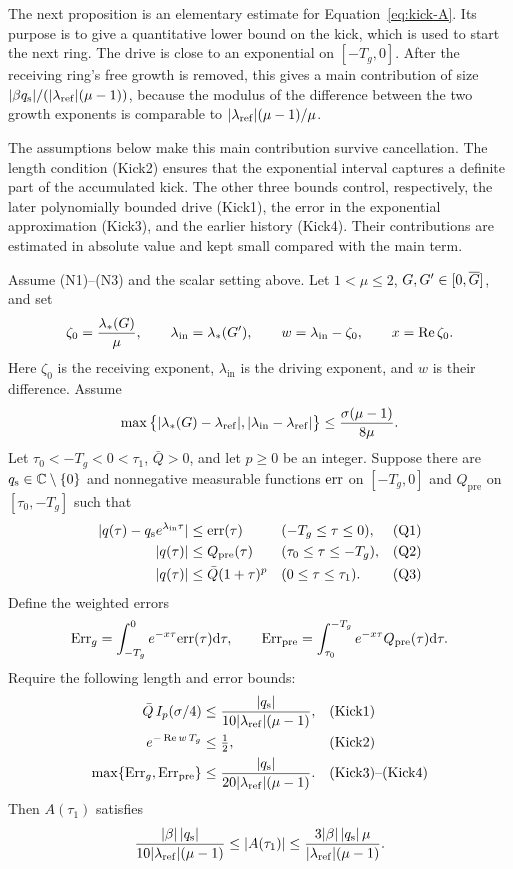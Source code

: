 The next proposition is an elementary estimate for Equation~\eqref{eq:kick-A}.
Its purpose is to give a quantitative lower bound on the kick, which is used
to start the next ring. The drive is close to an exponential on
$[-T_g,0]$. After the receiving ring's free growth is removed, this gives a
main contribution of size $|\beta q_{\mathrm{s}}|/(|\lambda_{\mathrm{ref}}|(\mu-1))$, because the
modulus of the difference between the two growth exponents is comparable to
$|\lambda_{\mathrm{ref}}|(\mu-1)/\mu$.

The assumptions below make this main contribution survive cancellation.
The length condition \textup{(Kick2)} ensures that the exponential interval
captures a definite part of the accumulated kick. The other three bounds
control, respectively, the later polynomially bounded drive
\textup{(Kick1)}, the error in the exponential approximation
\textup{(Kick3)}, and the earlier history \textup{(Kick4)}. Their contributions
are estimated in absolute value and kept small compared with the main term.

\begin{samepage}
\begin{proposition}
\label{prop:kick}
Assume \textup{(N1)}--\textup{(N3)} and the scalar setting above. Let
$1<\mu\le2$, $G,G'\in[0,\overline{G}]$, and set
\[
\zeta_0=\frac{\lambda_*(G)}\mu,\qquad
\lambda_{\mathrm{in}}=\lambda_*(G'),\qquad
w=\lambda_{\mathrm{in}}-\zeta_0,\qquad x=\Re\zeta_0.
\]
Here $\zeta_0$ is the receiving exponent, $\lambda_{\mathrm{in}}$ is the driving
exponent, and $w$ is their difference.
Assume
\[
\max\big\{|\lambda_*(G)-\lambda_{\mathrm{ref}}|,|\lambda_{\mathrm{in}}-\lambda_{\mathrm{ref}}|\big\}
\le\frac{\sigma(\mu-1)}{8\mu}.
\]
Let $\tau_0<-T_g<0<\tau_1$, $\bar Q>0$, and let $p\ge0$ be an integer.
Suppose there are $q_{\mathrm{s}}\in\mathbb{C}\setminus\{0\}$ and nonnegative measurable functions
$\mathrm{err}$ on $[-T_g,0]$ and $Q_{\mathrm{pre}}$ on $[\tau_0,-T_g]$ such that
\[
\begin{aligned}
|q(\tau)-q_{\mathrm{s}} e^{\lambda_{\mathrm{in}}\tau}|&\le\mathrm{err}(\tau)
&&(-T_g\le\tau\le0),&&\textup{(Q1)}\\
|q(\tau)|&\le Q_{\mathrm{pre}}(\tau)
&&(\tau_0\le\tau\le-T_g),&&\textup{(Q2)}\\
|q(\tau)|&\le\bar Q(1+\tau)^p
&&(0\le\tau\le\tau_1).&&\textup{(Q3)}
\end{aligned}
\]
Define the weighted errors
\[
\mathrm{Err}_g=\int_{-T_g}^0e^{-x\tau}\mathrm{err}(\tau)\dd\tau,\qquad
\mathrm{Err}_{\mathrm{pre}}=\int_{\tau_0}^{-T_g}e^{-x\tau}Q_{\mathrm{pre}}(\tau)\dd\tau.
\]
Require the following length and error bounds:
\[
\begin{aligned}
\bar Q\,I_{p}(\sigma/4)&\le\frac{|q_{\mathrm{s}}|}{10|\lambda_{\mathrm{ref}}|(\mu-1)},
&&\textup{(Kick1)}\\
e^{-\Re w\,T_g}&\le\tfrac12,
&&\textup{(Kick2)}\\
\max\{\mathrm{Err}_g,\mathrm{Err}_{\mathrm{pre}}\}&\le\frac{|q_{\mathrm{s}}|}{20|\lambda_{\mathrm{ref}}|(\mu-1)}.
&&\textup{(Kick3)--(Kick4)}
\end{aligned}
\]
Then $A(\tau_1)$ satisfies
\[
\frac{|\beta|\,|q_{\mathrm{s}}|}{10|\lambda_{\mathrm{ref}}|(\mu-1)}
\le|A(\tau_1)|\le
\frac{3|\beta|\,|q_{\mathrm{s}}|\,\mu}{|\lambda_{\mathrm{ref}}|(\mu-1)}.
\]
\end{proposition}
\end{samepage}

